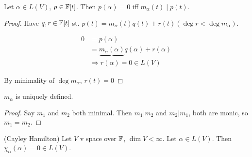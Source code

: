 \documentclass[a4paper]{article}
\begin{document}
\begin{lemma} 
	Let $ \alpha \in L(V) $, $ p \in \mathbb{F} [t] $. Then $ p(\alpha) = 0 $ iff $ m_{\alpha}(t) \; | \; p(t) $.
	
\end{lemma}

\begin{proof}
	Have $ q,r \in \mathbb{F} [t] $ st. $ p(t) = m_{\alpha}(t) q(t) + r(t) ( \deg r < \deg m_{\alpha}). $
	
	\begin{align*}
	0 & =p(\alpha) \\
	& = \underbrace{m_{\alpha}(\alpha)} q(\alpha) + r(\alpha) \\
	& \Rightarrow r(\alpha) = 0 \in L(V)
	\end{align*}
	
	By minimality of $ \deg m_{\alpha} $, $ r(t) = 0 $
\end{proof}

\begin{cor}  $ m_{\alpha} $ is uniquely defined.
	
\end{cor}

\begin{proof}
	Say $ m_{1} $ and $ m_{2} $ both minimal. Then $ m_{1} | m_{2} $ and $ m_{2} | m_{1} $, both are monic, so $ m_{1} = m_{2}  $.
\end{proof}

\begin{thm} (Cayley Hamilton)
	Let $ V  $ v space over $ \mathbb{F} $, $ \dim V < \infty $. Let $ \alpha \in L(V) $. Then $ \chi_{\alpha}(\alpha) = 0 \in L(V) $.
\end{thm}
\end{document}
